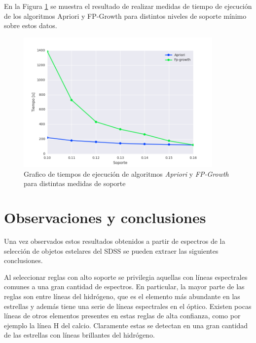 En la Figura \ref{fig:complexity_support} se muestra el resultado de realizar medidas de tiempo de ejecución de los algoritmos Apriori y FP-Growth para distintos niveles de soporte mínimo sobre estos datos.

\begin{figure}[h!]
\begin{center}
\includegraphics[width=0.9\textwidth]{imagenes/complexity_support.png}
\end{center}
\vspace*{-5mm}
\caption{Grafico de tiempos de ejecución de algoritmos \textit{Apriori} y \textit{FP-Growth} para distintas medidas de soporte}
\label{fig:complexity_support}
\end{figure}

\section{Observaciones y conclusiones}

Una vez observados estos resultados obtenidos a partir de espectros de la selección de objetos estelares del SDSS se pueden extraer las siguientes conclusiones.

Al seleccionar reglas con alto soporte se privilegia aquellas con líneas espectrales comunes a una gran cantidad de espectros. En particular, la mayor parte de las reglas son entre líneas del hidrógeno, que es el elemento más abundante en las estrellas y además tiene una serie de líneas espectrales en el óptico. Existen pocas líneas de otros elementos presentes en estas reglas de alta confianza, como por ejemplo la línea H del calcio. Claramente estas se detectan en una gran cantidad de las estrellas con líneas brillantes del hidrógeno.

